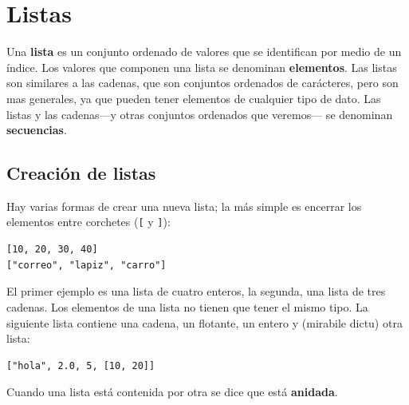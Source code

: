 


\chapter{Listas}
\label{cap:listas}

Una {\bf lista} es un conjunto ordenado de valores que se identifican
por medio de un índice.  Los valores que componen una lista se 
denominan  {\bf elementos}. Las listas son similares a las cadenas, 
que son conjuntos ordenados de carácteres, pero son mas generales, ya
que pueden tener elementos de cualquier tipo de dato. Las listas y 
las cadenas---y otras conjuntos ordenados que veremos--- se denominan 
{\bf secuencias}.


\section{Creación de listas}

Hay varias formas de crear una nueva lista; la más simple es
encerrar los elementos entre corchetes (\verb+[+ y \verb+]+):

\beforeverb
\begin{verbatim}
[10, 20, 30, 40]
["correo", "lapiz", "carro"]
\end{verbatim}
\afterverb
%
El primer ejemplo es una lista de cuatro enteros, la segunda, una
lista de tres cadenas. Los elementos de una lista no tienen que
tener el mismo tipo. La siguiente lista contiene una cadena, un 
flotante, un entero y (mirabile dictu) otra lista:

\beforeverb
\begin{verbatim}
["hola", 2.0, 5, [10, 20]]
\end{verbatim}
\afterverb
%
Cuando una lista está contenida por  otra  se dice que está {\bf anidada}.

